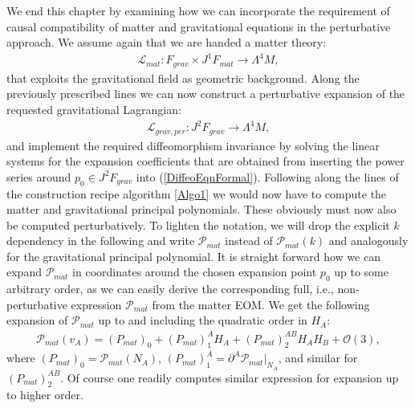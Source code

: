 We end this chapter by examining how we can incorporate the requirement of causal compatibility of matter and gravitational equations in the perturbative approach.
We assume again that we are handed a matter theory: 
\begin{align}
    \mathcal{L}_{mat} : F_{grav} \times J^1F_{mat} \longrightarrow \Lambda^4M,
\end{align}
that exploits the gravitational field as geometric background. Along the previously prescribed lines we can now construct a perturbative expansion of the requested gravitational Lagrangian:
\begin{align}
    \mathcal{L}_{grav,per} : J^2F_{grav} \longrightarrow \Lambda^4M,
\end{align}
and implement the required diffeomorphism invariance by solving the linear systems for the expansion coefficients that are obtained from inserting the power series around $p_0 \in J^2F_{grav}$ into (\ref{DiffeoEqnFormal}). 
Following along the lines of the construction recipe algorithm \ref{Algo1} we would now have to compute the matter and gravitational principal polynomials.
These obviously must now also be computed perturbatively. 
To lighten the notation, we will drop the explicit $k$ dependency in the following and write $\mathcal{P}_{mat}$ instead of $\mathcal{P}_{mat}(k)$ and analogously for the gravitational principal polynomial. It is straight forward how we can expand $\mathcal{P}_{mat}$ in coordinates around the chosen expansion point $p_0$ up to some arbitrary order, as we can easily derive the corresponding full, i.e., non-perturbative expression $\mathcal{P}_{mat}$ from the matter EOM. We get the following expansion of $\mathcal{P}_{mat}$ up to and including the quadratic order in $H_A$:
\begin{align}
    \mathcal{P}_{mat}(v_A) = (P_{mat})_{0} + (P_{mat})^A_1 H_A+ (P_{mat})^{AB}_2 H_A H_B +\mathcal{O}(3),
\end{align}
where $(P_{mat})_0 = \mathcal{P}_{mat}(N_A)$, $(P_{mat})_1^A = \partial^A \mathcal{P}_{mat} \vert _{N_A}$, and similar for $(P_{mat})^{AB}_2$. Of course one readily computes similar expression for expansion up to higher order. 

